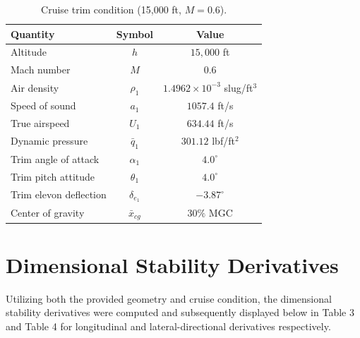 \documentclass[11pt]{article}
\newcommand{\qbar}{\bar{q}}
\begin{document}
\begin{table}[h]\label{tab:table_2}
\centering
\caption{Cruise trim condition (15{,}000 ft, $M = 0.6$).}
\begin{tabular}{lcc}
\toprule
\textbf{Quantity} & \textbf{Symbol} & \textbf{Value} \\
\midrule
Altitude                  & $h$       & $15{,}000$ ft \\
Mach number               & $M$       & $0.6$ \\
Air density               & $\rho_1$  & $1.4962 \times 10^{-3}$ slug/ft$^3$ \\
Speed of sound            & $a_1$     & $1057.4$ ft/s \\
True airspeed             & $U_1$     & $634.44$ ft/s \\
Dynamic pressure          & $\qbar_1$ & $301.12$ lbf/ft$^2$ \\
Trim angle of attack      & $\alpha_1$ & $4.0^\circ$ \\
Trim pitch attitude       & $\theta_1$ & $4.0^\circ$ \\
Trim elevon deflection    & $\delta_{e_1}$ & $-3.87^\circ$ \\
Center of gravity         & $\bar x_{cg}$       & $30\%$ MGC \\
\bottomrule
\end{tabular}
\end{table}

\newpage

\section{Dimensional Stability Derivatives}

Utilizing both the provided geometry and cruise condition, the dimensional stability derivatives were computed
and subsequently displayed below in Table 3 and Table 4 for longitudinal and lateral-directional derivatives
respectively.
\end{document}
